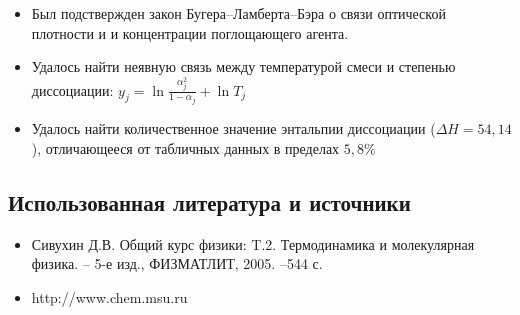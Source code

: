 \documentclass[a4paper,12pt]{article} %
\begin{document}
\begin{itemize}
	\item Был подствержден закон Бугера--Ламберта--Бэра о связи оптической плотности и и концентрации поглощающего агента.
	\item Удалось найти неявную связь между температурой смеси и степенью диссоциации: $y_j =  \ln \frac{ \alpha_j^2}{1 - \alpha_j} + \ln T_j $ 
	\item Удалось найти количественное значение энтальпии диссоциации (\(\Delta H = 54,14 \)), отличающееся от табличных данных в пределах $5,8\%$ \


\end{itemize}


\subsection*{Использованная литература и источники}
\begin{itemize}
	\item Сивухин Д.В. Общий курс физики: T.2. Термодинамика и молекулярная физика. -- 5-е изд., ФИЗМАТЛИТ, 2005. --544 с. 
	\item http://www.chem.msu.ru


\end{itemize}




  
\end{document}

